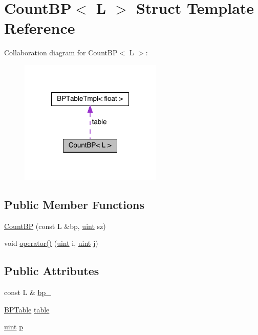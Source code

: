 \hypertarget{struct_count_b_p}{\section{Count\+B\+P$<$ L $>$ Struct Template Reference}
\label{struct_count_b_p}
}


Collaboration diagram for Count\+B\+P$<$ L $>$\+:
\nopagebreak
\begin{figure}[H]
\begin{center}
\leavevmode
\includegraphics[width=192pt]{struct_count_b_p__coll__graph}
\end{center}
\end{figure}
\subsection*{Public Member Functions}
\begin{DoxyCompactItemize}
\item 
\hyperlink{struct_count_b_p_a09d0dffbc177a9272313317e98ba9949}{Count\+B\+P} (const L \&bp, \hyperlink{cyktable_8h_a91ad9478d81a7aaf2593e8d9c3d06a14}{uint} sz)
\item 
void \hyperlink{struct_count_b_p_af0d579ca3bf03a8d60a5a82d074f636d}{operator()} (\hyperlink{cyktable_8h_a91ad9478d81a7aaf2593e8d9c3d06a14}{uint} i, \hyperlink{cyktable_8h_a91ad9478d81a7aaf2593e8d9c3d06a14}{uint} j)
\end{DoxyCompactItemize}
\subsection*{Public Attributes}
\begin{DoxyCompactItemize}
\item 
const L \& \hyperlink{struct_count_b_p_a4da16caf4616d8c453998871ba03bbad}{bp\+\_\+}
\item 
\hyperlink{folding__engine_8h_a065821fb17bbd8df315f2435c973e3c1}{B\+P\+Table} \hyperlink{struct_count_b_p_ae4266a3c6b2c80dc0f8bdb82124630c5}{table}
\item 
\hyperlink{cyktable_8h_a91ad9478d81a7aaf2593e8d9c3d06a14}{uint} \hyperlink{struct_count_b_p_a92de403d8e8a52294a85dbe93ce1e8b9}{p}
\end{DoxyCompactItemize}


